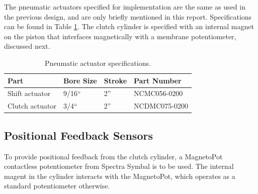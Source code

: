 The pneumatic actuators specified for implementation are the same as used in the previous design, and are only briefly mentioned in this report. Specifications can be found in Table \ref{tab:cylinder_specs}. The clutch cylinder is specified with an internal magnet on the piston that interfaces magnetically with a membrane potentiometer, discussed next.

\begin{table}[H]
 \caption{Pneumatic actuator specifications.\label{tab:cylinder_specs}}
  \centering
  \begin{tabular}{|l|l|l|l|}
   \hline
   Part & Bore Size & Stroke & Part Number \tabularnewline
    \hline
    \hline
    Shift actuator & 9/16`` & 2'' & NCMC056-0200 \tabularnewline
    \hline
    Clutch actuator & 3/4`` & 2'' & NCDMC075-0200 \tabularnewline
    \hline
  \end{tabular}
\end{table}

\subsection{Positional Feedback Sensors}

To provide positional feedback from the clutch cylinder, a MagnetoPot contactless potentiometer from Spectra Symbal is to be used. The internal magent in the cylinder interacts with the MagnetoPot, which operates as a standard potentiometer otherwise.